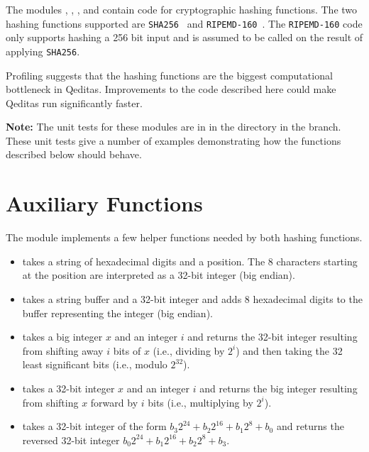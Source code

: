 The modules {}, {}, {}, {}
and {} contain code for cryptographic hashing functions.
The two hashing functions supported are {\tt{SHA256}}~\cite{sha256} and {\tt{RIPEMD-160}}~\cite{ripemd160}.
The {\tt{RIPEMD-160}} code only supports hashing a 256 bit input and is
assumed to be called on the result of applying {\tt{SHA256}}.

Profiling suggests that the hashing functions are the biggest computational bottleneck
in Qeditas. Improvements to the code described here could make Qeditas run significantly faster.

{\bf{Note:}} The unit tests for these modules are in {}
in the {}
directory in the {} branch.
These unit tests give a number of examples demonstrating how the functions described below should behave.

\section{Auxiliary Functions}

The module {} implements a few helper functions needed by both hashing functions.
\begin{itemize}
\item {} takes a string of hexadecimal digits and a position. The 8 characters starting at the position are interpreted as a 32-bit integer (big endian).
\item {} takes a string buffer and a 32-bit integer and adds 8 hexadecimal digits to the buffer representing the integer (big endian).
\item {} takes a big integer $x$ and an integer $i$ and returns the 32-bit integer resulting from shifting away $i$ bits of $x$ (i.e., dividing by $2^i$) and then taking the 32 least significant bits (i.e., modulo $2^{32}$).
\item {} takes a 32-bit integer $x$ and an integer $i$ and returns the big integer resulting from shifting $x$ forward by $i$ bits (i.e., multiplying by $2^i$).
\item {} takes a 32-bit integer of the form $b_3 2^{24} + b_2 2^{16} + b_1 2^{8} + b_0$
and returns the reversed 32-bit integer $b_0 2^{24} + b_1 2^{16} + b_2 2^{8} + b_3$.
\end{itemize}

